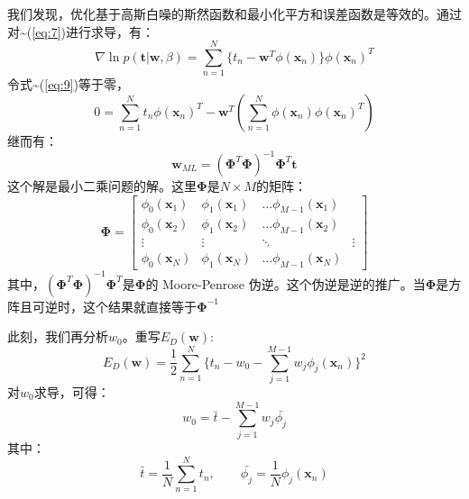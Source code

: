 \documentclass[10pt,a4paper,UTF8]{article}
\begin{document}
我们发现，优化基于高斯白噪的斯然函数和最小化平方和误差函数是等效的。通过对\textasciitilde{}(\ref{eq:7})进行求导，有：
\begin{equation}
\label{eq:9}
\nabla \ln p(\mathbf{t} | \mathbf{w},\beta) = \sum_{n=1}^{N}\{t_{n} - \mathbf{w}^{T}\phi(\mathbf{x}_{n})\} \phi(\mathbf{x}_{n})^{T}
\end{equation}
令式\textasciitilde{}(\ref{eq:9})等于零，
\begin{equation}
\label{eq:10}
0 = \sum_{n=1}^{N}t_{n}\phi(\mathbf{x}_{n})^{T} - \mathbf{w}^{T}(\sum_{n=1}^{N}\phi(\mathbf{x}_{n})\phi(\mathbf{x}_{n})^{T})
\end{equation}
继而有：
\begin{equation}
\label{eq:11}
\mathbf{w}_{ML} = (\mathbf{\Phi}^{T}\mathbf{\Phi})^{-1} \mathbf{\Phi}^{T}\mathbf{t}
\end{equation}
这个解是最小二乘问题的解。这里\(\mathbf{\Phi}\)是\(N\times M\)的矩阵：
\begin{equation}
\label{eq:12}
\mathbf{\Phi} =
\begin{bmatrix}
\phi_{0}(\mathbf{x}_{1}) &  \phi_{1}(\mathbf{x}_{1}) & \ldots \phi_{M-1}(\mathbf{x}_{1})  \\
\phi_{0}(\mathbf{x}_{2}) &  \phi_{1}(\mathbf{x}_{2}) & \ldots \phi_{M-1}(\mathbf{x}_{2})  \\
\vdots & \vdots & \ddots & \vdots \\
\phi_{0}(\mathbf{x}_{N}) &  \phi_{1}(\mathbf{x}_{N}) & \ldots \phi_{M-1}(\mathbf{x}_{N})
\end{bmatrix}
\end{equation}
其中，\((\mathbf{\Phi}^{T}\mathbf{\Phi})^{-1}\mathbf{\Phi}^{T}\)是\(\mathbf{\Phi}\)的 Moore-Penrose 伪逆。这个伪逆是逆的推广。当\(\mathbf{\Phi}\)是方阵且可逆时，这个结果就直接等于\(\mathbf{\Phi}^{-1}\)

此刻，我们再分析\(w_{0}\)。重写\(E_{D}(\mathbf{w})\):
\begin{equation}
\label{eq:13}
E_{D}(\mathbf{w}) = \frac{1}{2}\sum_{n=1}^{N}\{t_{n} - w_{0} - \sum_{j=1}^{M-1}w_{j}\phi_{j}(\mathbf{x}_{n})\}^{2}
\end{equation}
对\(w_{0}\)求导，可得：
\begin{equation}
\label{eq:14}
w_{0} = \bar{t} -\sum_{j=1}^{M-1}w_{j}\bar{\phi_{j}}
\end{equation}
其中：
\begin{equation}
\label{eq:15}
\bar{t} = \frac{1}{N}\sum_{n=1}^{N}t_{n},\qquad \bar{\phi_{j}} = \frac{1}{N} \phi_{j}(\mathbf{x}_{n})
\end{equation}
\end{document}
